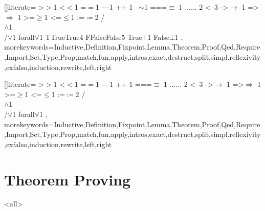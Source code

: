 []{}{literate=%
{>}{{$>$}}{1}
{<}{{$<$}}{1}
{=}{{$=$}}{1}
{-}{{$-$}}{1}
{+}{{$+$ }}{1}
{~}{{$\sim$}}{1}
{===}{$\equiv$ }{1}
{...}{$\ldots$ }{2}
{<--}{}{3}
{->}{$\rightarrow$ }{1}
{=>}{$\Rightarrow$ }{1}
{>=}{$\ge$}{1}
{<=}{$\le$}{1}
{:=}{$\coloneqq$}{2}
{/\\}{{$\wedge$}}{1}
{\\/}{{$\vee$}}{1}
{forall}{$\forall$}{1}
{TTrue}{{True}}{4}
{FFalse}{{False}}{5}
{True}{{$\top$}}{1}
{False}{{$\bot$}}{1}
,
morekeywords={Inductive,Definition,Fixpoint,Lemma,Theorem,Proof,Qed,Require,Import,Set,Type,Prop,match,fun,apply,intros,exact,destruct,split,simpl,reflexivity,exfalso,induction,rewrite,left,right}
}
\lstset{style=Coq}

[]{}{literate=%
{>}{{$>$}}{1}
{<}{{$<$}}{1}
{=}{{$=$}}{1}
{-}{{$-$}}{1}
{+}{{$+$ }}{1}
{===}{$\equiv$ }{1}
{...}{$\ldots$ }{2}
{<--}{}{3}
{->}{$\rightarrow$ }{1}
{=>}{$\Rightarrow$ }{1}
{>=}{$\ge$}{1}
{<=}{$\le$}{1}
{:=}{$\coloneqq$}{2}
{/\\}{{$\wedge$}}{1}
{\\/}{{$\vee$}}{1}
{forall}{$\forall$}{1}
,
morekeywords={Inductive,Definition,Fixpoint,Lemma,Theorem,Proof,Qed,Require,Import,Set,Type,Prop,match,fun,apply,intros,exact,destruct,split,simpl,reflexivity,exfalso,induction,rewrite,left,right}
}
\lstset{style=Coq}

\chapter{Theorem Proving}
\label{chap_theorem}






\exercises

\mode
<all>
